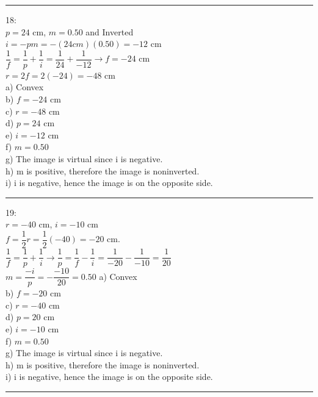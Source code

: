 \documentclass[fleqn]{article}
\begin{document}
\begin{enumerate}
    \textcolor{hwColor}{
      \rule{15cm}{0.4pt}
    }

    \textcolor{hwColor}{
      18: \\
      $p=24$ cm, $m=0.50$ and Inverted\\
      $i=-pm=-(24 cm)(0.50)=-12$ cm \\
      $\dfrac{1}{f}=\dfrac{1}{p}+\dfrac{1}{i}=\dfrac{1}{24}+\dfrac{1}{-12} \rightarrow f=-24$ cm \\
      $r=2f=2(-24)=-48$ cm \\
      a) Convex \\
      b) $f=-24$ cm \\
      c) $r=-48$ cm \\
      d) $p=24$ cm \\
      e) $i=-12$ cm \\
      f) $m=0.50$ \\
      g) The image is virtual since i is negative. \\
      h) m is positive, therefore the image is noninverted. \\
      i) i is negative, hence the image is on the opposite side. \\
    }

    \textcolor{hwColor}{
      \rule{15cm}{0.4pt}
    }

    \textcolor{hwColor}{
      19: \\
      $r=-40$ cm, $i=-10$ cm\\
      $f=\dfrac{1}{2}r=\dfrac{1}{2}(-40)=-20$ cm. \\
      $\dfrac{1}{f}=\dfrac{1}{p}+\dfrac{1}{i} \rightarrow \dfrac{1}{p}=\dfrac{1}{f}-\dfrac{1}{i}=\dfrac{1}{-20}-\dfrac{1}{-10}=\dfrac{1}{20}$ \\
      $m=\dfrac{-i}{p}=-\dfrac{-10}{20}=0.50$
      a) Convex \\
      b) $f=-20$ cm \\
      c) $r=-40$ cm \\
      d) $p=20$ cm \\
      e) $i=-10$ cm \\
      f) $m=0.50$ \\
      g) The image is virtual since i is negative. \\
      h) m is positive, therefore the image is noninverted. \\
      i) i is negative, hence the image is on the opposite side. \\
    }

    \textcolor{hwColor}{
      \rule{15cm}{0.4pt}
    }


\end{enumerate}
\end{document}
